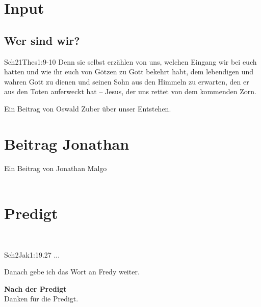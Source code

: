 \documentclass{../inc/mybib}
\begin{document}

\section{ Input }
\begin{spacing}{1.5}
\subsection{Wer sind wir?}
\begin{bibeltext}{Sch2}{1Thes}{1:9-10}
Denn sie selbst erzählen von uns, welchen Eingang wir bei euch hatten und wie ihr euch von Götzen zu Gott bekehrt habt, dem lebendigen und wahren Gott zu dienen und seinen Sohn aus den Himmeln zu erwarten, den er aus den Toten auferweckt hat -- Jesus, der uns rettet von dem kommenden Zorn.
\end{bibeltext}

Ein Beitrag von Oswald Zuber über unser Entstehen.
\end{spacing}


\section{Beitrag Jonathan}
Ein Beitrag von Jonathan Malgo\\

\\

\section{Predigt}
\\
\begin{bibeltext}{Sch2}{Jak}{1:19.27}
...
\end{bibeltext}
Danach gebe ich das Wort an Fredy weiter.

\textbf{Nach der Predigt}\\

Danken für die Predigt.\\

\\
\end{document}
